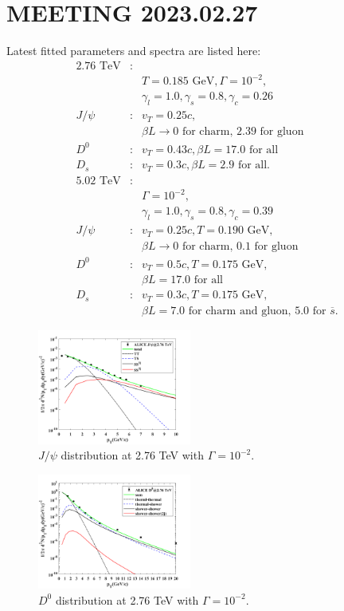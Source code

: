 \documentclass[twocolumn,aps,superscriptaddress,nofootinbib,floatfix]{revtex4}
\begin{document}
\section{MEETING 2023.02.27}
Latest fitted parameters and spectra are listed here:
\begin{eqnarray}
	\text{2.76 TeV}&:&  \nonumber \\
	&&T=0.185 \text{ GeV}, \Gamma=10^{-2}, \nonumber \\
	&&\gamma_l=1.0,  \gamma_s=0.8 ,\gamma_c=0.26\nonumber \\
	J/\psi&:& v_T=0.25c,  \\ \nonumber
	&&\beta L\rightarrow \text{0 for charm, 2.39 for gluon}\nonumber\\
	D^0&:& v_T=0.43c,  \beta L=\text{17.0 for all}\nonumber\\
	D_s&:& v_T=0.3c,    \beta L=\text{2.9 for all}.\nonumber\\
	\text{5.02 TeV}&:&  \nonumber \\
	&&\Gamma=10^{-2}, \nonumber \\
	&&\gamma_l=1.0,  \gamma_s=0.8 ,\gamma_c=0.39\nonumber \\
	J/\psi&:& v_T=0.25c,  T=0.190 \text{ GeV},\\ \nonumber
	&&\beta L\rightarrow \text{0 for charm, 0.1 for gluon}\nonumber\\
	D^0&:& v_T=0.5c,  T=0.175 \text{ GeV},\\ \nonumber
	&&\beta L=\text{17.0 for all}\nonumber\\
	D_s&:& v_T=0.3c,   T=0.175 \text{ GeV},\\ \nonumber
	&&\beta L=\text{7.0 for charm and gluon, 5.0 for $\overline{s}$}.\nonumber
\end{eqnarray}
\begin{figure}[H]
	\includegraphics[width=0.45\textwidth]{Jpsi276_230223.png}
	\caption{$J/\psi$ distribution at 2.76 TeV with $\Gamma=10^{-2}$. }
	\label{fig58}
\end{figure}
\begin{figure}[H]
	\includegraphics[width=0.45\textwidth]{D0276_230223.png}
	\caption{$D^0$ distribution at 2.76 TeV with $\Gamma=10^{-2}$. }
	\label{fig59}
\end{figure}
\end{document}
